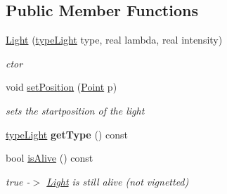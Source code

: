 \subsection*{Public Member Functions}
\begin{DoxyCompactItemize}
\item 
\hyperlink{classLight_aa3c2e043724b07ece1e11732472b9520}{Light} (\hyperlink{light_8h_a6dc57eac1ae8b19466de554123d5c6c3}{type\+Light} type, real lambda, real intensity)
\begin{DoxyCompactList}\small\item\em ctor \end{DoxyCompactList}\item 
void \hyperlink{classLight_ad23d1727356fae1075d82f5e9596f886}{set\+Position} (\hyperlink{classPoint}{Point} p)\hypertarget{classLight_ad23d1727356fae1075d82f5e9596f886}{}\label{classLight_ad23d1727356fae1075d82f5e9596f886}

\begin{DoxyCompactList}\small\item\em sets the startposition of the light \end{DoxyCompactList}\item 
\hyperlink{light_8h_a6dc57eac1ae8b19466de554123d5c6c3}{type\+Light} {\bfseries get\+Type} () const \hypertarget{classLight_a8571ce69ae09c26937733d435c0d0276}{}\label{classLight_a8571ce69ae09c26937733d435c0d0276}

\item 
bool \hyperlink{classLight_aa5371398a56853b58e9eaf87ca418bac}{is\+Alive} () const 
\begin{DoxyCompactList}\small\item\em true -\/$>$ \hyperlink{classLight}{Light} is still alive (not vignetted) \end{DoxyCompactList}\end{DoxyCompactItemize}
